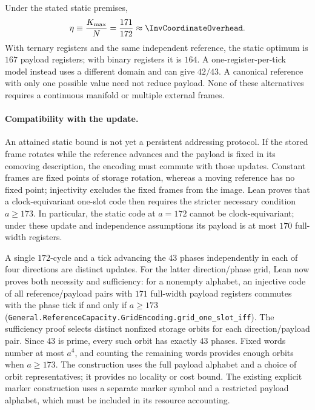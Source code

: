 Under the stated static premises,
\begin{equation}
\label{eq:coordinate_overhead}
 \eta\equiv\frac{K_{\max}}{N}=\frac{171}{172}
 \approx\InvCoordinateOverhead.
\end{equation}
With ternary registers and the same independent reference, the static optimum is $167$ payload registers; with binary registers it is $164$. A one-register-per-tick model instead uses a different domain and can give $42/43$. A canonical reference with only one possible value need not reduce payload. None of these alternatives requires a continuous manifold or multiple external frames.

\paragraph{Compatibility with the update.}
An attained static bound is not yet a persistent addressing protocol. If the stored frame rotates while the reference advances and the payload is fixed in its comoving description, the encoding must commute with those updates. Constant frames are fixed points of storage rotation, whereas a moving reference has no fixed point; injectivity excludes the fixed frames from the image. Lean proves that a clock-equivariant one-slot code then requires the stricter necessary condition $a\geq173$. In particular, the static code at $a=172$ cannot be clock-equivariant; under these update and independence assumptions its payload is at most $170$ full-width registers.

A single $172$-cycle and a tick advancing the $43$ phases independently in each of four directions are distinct updates. For the latter direction/phase grid, Lean now proves both necessity and sufficiency: for a nonempty alphabet, an injective code of all reference/payload pairs with $171$ full-width payload registers commutes with the phase tick if and only if $a\geq173$ (\texttt{General.ReferenceCapacity.GridEncoding.grid\_one\_slot\_iff}). The sufficiency proof selects distinct nonfixed storage orbits for each direction/payload pair. Since $43$ is prime, every such orbit has exactly $43$ phases. Fixed words number at most $a^4$, and counting the remaining words provides enough orbits when $a\geq173$. The construction uses the full payload alphabet and a choice of orbit representatives; it provides no locality or cost bound. The existing explicit marker construction uses a separate marker symbol and a restricted payload alphabet, which must be included in its resource accounting.

